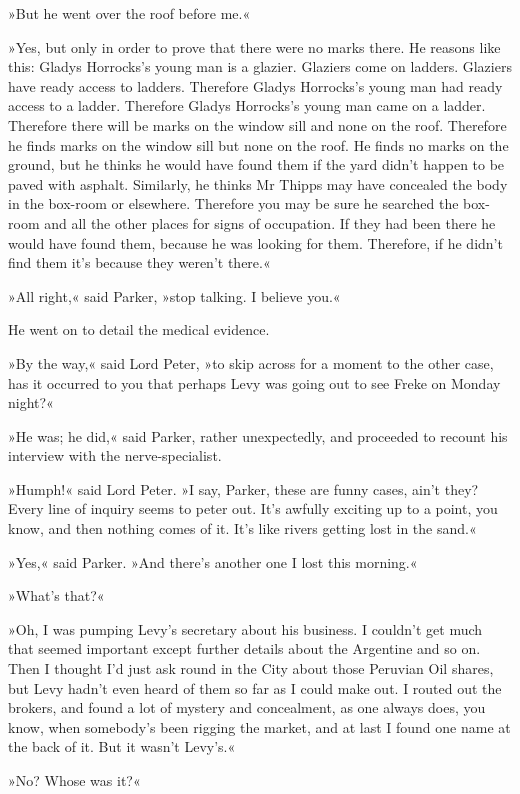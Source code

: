 »But he went over the roof before me.«

»Yes, but only in order to prove that there were no marks there. He reasons like this: Gladys Horrocks's young man is a glazier. Glaziers come on ladders. Glaziers have ready access to ladders. Therefore Gladys Horrocks's young man had ready access to a ladder. Therefore Gladys Horrocks's young man came on a ladder. Therefore there will be marks on the window sill and none on the roof. Therefore he finds marks on the window sill but none on the roof. He finds no marks on the ground, but he thinks he would have found them if the yard didn't happen to be paved with asphalt. Similarly, he thinks Mr Thipps may have concealed the body in the box-room or elsewhere. Therefore you may be sure he searched the box-room and all the other places for signs of occupation. If they had been there he would have found them, because he was looking for them. Therefore, if he didn't find them it's because they weren't there.«

»All right,« said Parker, »stop talking. I believe you.«

He went on to detail the medical evidence.

»By the way,« said Lord Peter, »to skip across for a moment to the other case, has it occurred to you that perhaps Levy was going out to see Freke on Monday night?«

»He was; he did,« said Parker, rather unexpectedly, and proceeded to recount his interview with the nerve-specialist.

»Humph!« said Lord Peter. »I say, Parker, these are funny cases, ain't they? Every line of inquiry seems to peter out. It's awfully exciting up to a point, you know, and then nothing comes of it. It's like rivers getting lost in the sand.«

»Yes,« said Parker. »And there's another one I lost this morning.«

»What's that?«

»Oh, I was pumping Levy's secretary about his business. I couldn't get much that seemed important except further details about the Argentine and so on. Then I thought I'd just ask round in the City about those Peruvian Oil shares, but Levy hadn't even heard of them so far as I could make out. I routed out the brokers, and found a lot of mystery and concealment, as one always does, you know, when somebody's been rigging the market, and at last I found one name at the back of it. But it wasn't Levy's.«

»No? Whose was it?«

